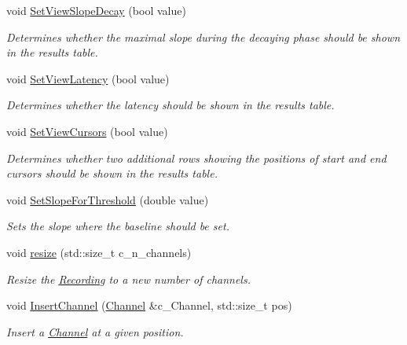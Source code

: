 \begin{DoxyCompactItemize}
void \hyperlink{classRecording_aa9c382133fb468d1f7d0a127e753190c}{SetViewSlopeDecay} (bool value)
\begin{DoxyCompactList}\small\item\em Determines whether the maximal slope during the decaying phase should be shown in the results table. \item\end{DoxyCompactList}\item 
void \hyperlink{classRecording_aaf529c696ae4a5b7a075cf63577863be}{SetViewLatency} (bool value)
\begin{DoxyCompactList}\small\item\em Determines whether the latency should be shown in the results table. \item\end{DoxyCompactList}\item 
void \hyperlink{classRecording_a72244e8072426e6db69c6ebb7e5652f1}{SetViewCursors} (bool value)
\begin{DoxyCompactList}\small\item\em Determines whether two additional rows showing the positions of start and end cursors should be shown in the results table. \item\end{DoxyCompactList}\item 
void \hyperlink{classRecording_a651fb49c50dcb3d2174ae75913eec08f}{SetSlopeForThreshold} (double value)
\begin{DoxyCompactList}\small\item\em Sets the slope where the baseline should be set. \item\end{DoxyCompactList}\item 
void \hyperlink{classRecording_a4f1f0432a00a553eeb63c482b2ec9e43}{resize} (std::size\_\-t c\_\-n\_\-channels)
\begin{DoxyCompactList}\small\item\em Resize the \hyperlink{classRecording}{Recording} to a new number of channels. \item\end{DoxyCompactList}\item 
void \hyperlink{classRecording_a926ad4f43e8be04cec150b1b485fdc3a}{InsertChannel} (\hyperlink{classChannel}{Channel} \&c\_\-Channel, std::size\_\-t pos)
\begin{DoxyCompactList}\small\item\em Insert a \hyperlink{classChannel}{Channel} at a given position. \item\end{DoxyCompactList}\item 

\end{DoxyCompactItemize}
